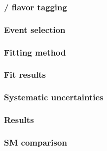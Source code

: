 \documentclass[18pt, aspectratio=169]{beamer}
\begin{document}
\begin{frame}
  \frametitle{{\PDzero}/{\APDzero} flavor tagging}
  
\end{frame}

\begin{frame}
  \frametitle{Event selection}
  
\end{frame}

\begin{frame}
  \frametitle{Fitting method}
  
\end{frame}

\begin{frame}
  \frametitle{Fit results}
  
\end{frame}

\begin{frame}
  \frametitle{Systematic uncertainties}
  
\end{frame}

\begin{frame}
  \frametitle{Results}
  
\end{frame}

\begin{frame}
  \frametitle{SM comparison}
  
\end{frame}
\end{document}
